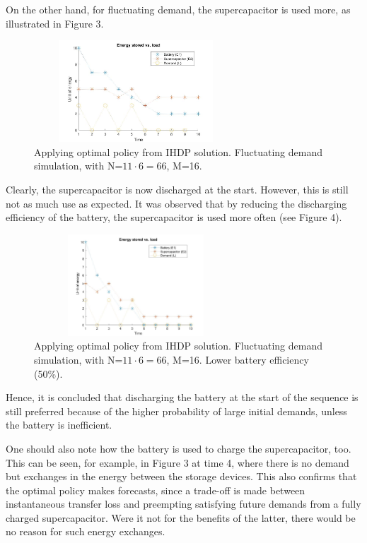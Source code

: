 \documentclass[conference]{IEEEtran}
\begin{document}
On the other hand, for fluctuating demand, the supercapacitor is used more, as illustrated in Figure 3.
\begin{figure}[htbp]
\centerline{\includegraphics[width=3in,height=1.5in]{EnergyStoredvsFluctuatingLoad(E1=10,E2=5).jpg}}
\caption{Applying optimal policy from IHDP solution. Fluctuating demand simulation, with N=$11\cdot6=66$, M=16.}
\label{fig}
\end{figure} Clearly, the supercapacitor is now discharged at the start. However, this is still not as much use as expected. It was observed that by reducing the discharging efficiency of the battery, the supercapacitor is used more often (see Figure 4).
\begin{figure}[htbp]
\centerline{\includegraphics[width=3in,height=1.5in]{EnergyStoredvsFluctuatingLoad_LowBattEff(E1=10,E2=5).jpg}}
\caption{Applying optimal policy from IHDP solution. Fluctuating demand simulation, with N=$11\cdot6=66$, M=16. Lower battery efficiency (50\%).}
\label{fig}
\end{figure} Hence, it is concluded that discharging the battery at the start of the sequence is still preferred because of the higher probability of large initial demands, unless the battery is inefficient.

One should also note how the battery is used to charge the supercapacitor, too. This can be seen, for example, in Figure 3 at time 4, where there is no demand but exchanges in the energy between the storage devices. This also confirms that the optimal policy makes forecasts, since a trade-off is made between instantaneous transfer loss and preempting satisfying future demands from a fully charged supercapacitor. Were it not for the benefits of the latter, there would be no reason for such energy exchanges.
\end{document}
